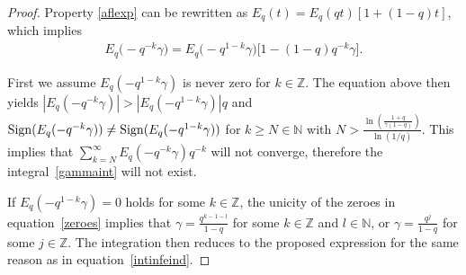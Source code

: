 \documentclass[11pt]{article}
\newcommand{\mN}{\mathbb{N}}
\newcommand{\mZ}{\mathbb{Z}}
\numberwithin{equation}{section}
\begin{document}
\begin{proof}
Property \eqref{aflexp} can be rewritten as $E_q(t)=E_q(qt)\left[1+(1-q)t\right]$, which implies
\begin{gather*}
E_q\big({-}q^{-k}\gamma\big) = E_q\big({-}q^{1-k}\gamma\big)\big[1-(1-q)q^{-k}\gamma\big].
\end{gather*}

First we assume $E_q(-q^{1-k}\gamma)$ is never zero for $k\in\mZ$. The equation above then yields $\left|E_q(-q^{-k}\gamma)\right|>\left|E_q(-q^{1-k}\gamma)\right|q$ and ${\rm Sign}(E_q(-q^{-k}\gamma))\not={\rm Sign}(E_q(-q^{1-k}\gamma))$ for $k\ge N\in\mN$ with $N>\frac{\ln\left(\frac{1+q}{\gamma(1-q)}\right)}{\ln(1/q)}$. This implies that $\sum\limits_{k=N}^\infty E_q(-q^{-k}\gamma)q^{-k}$ will not converge, therefore the integral~\eqref{gammaint} will not exist.

If $E_q(-q^{1-k}\gamma)=0$ holds for some $k\in\mZ$, the unicity of the zeroes in equation~\eqref{zeroes} implies that $\gamma=\frac{q^{k-1-l}}{1-q}$ for some $k\in\mZ$ and $l\in\mN$, or $\gamma=\frac{q^{j}}{1-q}$ for some $j\in\mZ$. The integration then reduces to the proposed expression for the same reason as in equation~\eqref{intinfeind}.
\end{proof}
\end{document}
